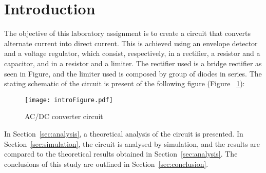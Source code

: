 \section{Introduction}
\label{sec:introduction}


\indent

The objective of this laboratory assignment is to create a circuit that converts alternate current into direct current. This is achieved using an envelope detector and a voltage regulator, which consist, respectively, in a rectifier, a resistor and a capacitor, and in a resistor and a limiter. The rectifier used is a bridge rectifier as seen in Figure, and the limiter used is composed by group of diodes in series.
The stating schematic of the circuit is present of the following figure (Figure ~\ref{fig:schematic}):


\begin{figure}[h!]
    \centering
    \texttt{[image: introFigure.pdf]}
    \caption{AC/DC converter circuit}
    \label{fig:schematic}
\end{figure}




In Section~\ref{sec:analysis}, a theoretical analysis of the circuit is
presented. In Section~\ref{sec:simulation}, the circuit is analysed by
simulation, and the results are compared to the theoretical results obtained in Section~\ref{sec:analysis}. The conclusions of this study are outlined in Section~\ref{sec:conclusion}.
